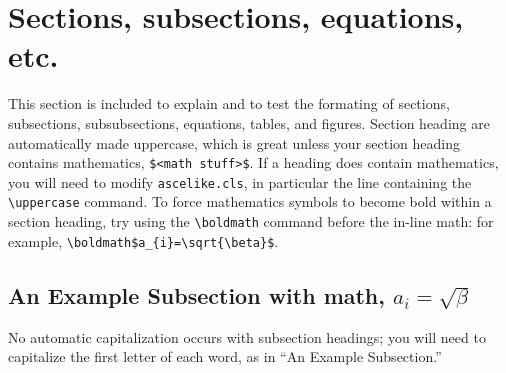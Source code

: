 \documentclass[Proceedings]{ascelike}
\begin{document}
\section{Sections, subsections, equations, etc.}
This section is included to explain and to 
test the formating of sections, subsections,
subsubsections, equations, tables, and figures.
Section heading are automatically made uppercase, which is great unless
your section heading contains mathematics, \verb+$<math stuff>$+.
If a heading does contain mathematics, you will need to modify
\texttt{ascelike.cls}, in particular the line containing the
\verb+\uppercase+ command.  
To force mathematics symbols to become 
bold within a section heading, try using
the \verb!\boldmath! command before the in-line math:
for example,
\verb!\boldmath$a_{i}=\sqrt{\beta}$!.
%
\subsection{An Example Subsection with math, \boldmath$a_{i}=\sqrt{\beta}$}
No automatic capitalization occurs with subsection headings; 
you will need to capitalize the first letter of each word,
as in ``An Example Subsection.''
%
\end{document}
